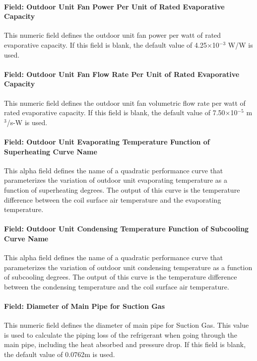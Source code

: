 \paragraph{Field: Outdoor Unit Fan Power Per Unit of Rated Evaporative Capacity}

This numeric field defines the outdoor unit fan power per watt of rated evaporative capacity. If this field is blank, the default value of 4.25$\times$10$^{-3}$ W/W is used.

\paragraph{Field: Outdoor Unit Fan Flow Rate Per Unit of Rated Evaporative Capacity}

This numeric field defines the outdoor unit fan volumetric flow rate per watt of rated evaporative capacity. If this field is blank, the default value of 7.50$\times$10$^{-5}$ m\(^{3}\)/s-W is used.

\paragraph{Field: Outdoor Unit Evaporating Temperature Function of Superheating Curve Name}

This alpha field defines the name of a quadratic performance curve that parameterizes the variation of outdoor unit evaporating temperature as a function of superheating degrees. The output of this curve is the temperature difference between the coil surface air temperature and the evaporating temperature.

\paragraph{Field: Outdoor Unit Condensing Temperature Function of Subcooling Curve Name}

This alpha field defines the name of a quadratic performance curve that parameterizes the variation of outdoor unit condensing temperature as a function of subcooling degrees. The output of this curve is the temperature difference between the condensing temperature and the coil surface air temperature.

\paragraph{Field: Diameter of Main Pipe for Suction Gas}

This numeric field defines the diameter of main pipe for Suction Gas. This value is used to calculate the piping loss of the refrigerant when going through the main pipe, including the heat absorbed and pressure drop. If this field is blank, the default value of 0.0762m is used.

